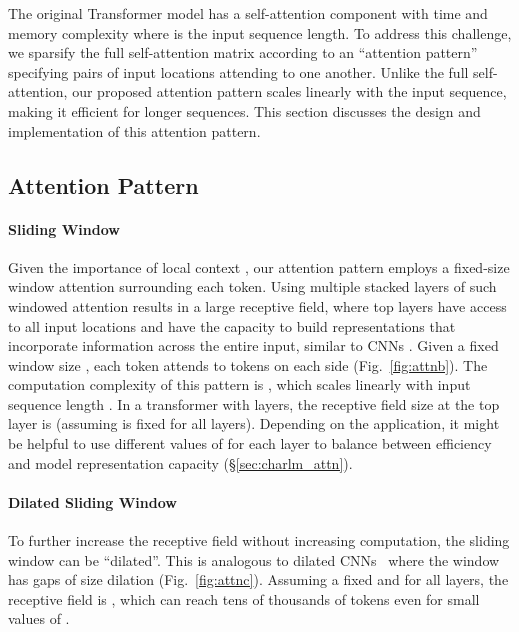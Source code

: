 \documentclass[11pt,a4paper]{article}
\begin{document}
The original Transformer model has a self-attention component with  time and memory complexity where  is the input sequence length. To address this challenge, we sparsify the full self-attention matrix according to 
an ``attention pattern'' specifying pairs of input locations attending to one another.
Unlike the full self-attention, our proposed attention pattern scales linearly with the input sequence, making it efficient for longer sequences.
This section discusses the design and implementation of this attention pattern. 



\subsection{Attention Pattern}
\label{sec:attn}


\paragraph{Sliding Window}
Given the importance of local context \cite{Kovaleva2019RevealingTD}, our attention pattern employs a fixed-size window attention
surrounding each token.
Using multiple stacked layers of such windowed attention results in a large receptive field, where top layers have access to all input locations and have the capacity to build representations that incorporate information across the entire input, similar to CNNs \cite{Wu2019PayLA}.
Given a fixed window size , each token attends to  tokens on each side (Fig.~\ref{fig:attnb}).
The computation complexity of this pattern is , which scales linearly with input sequence length . In a transformer with  layers, the receptive field size at the top layer is  (assuming  is fixed for all layers).
Depending on the application, it might be helpful to use different values of  for each layer to balance between efficiency and model representation capacity (\S\ref{sec:charlm_attn}).

\paragraph{Dilated Sliding Window}
To further increase the receptive field without increasing computation, the sliding window can be ``dilated''. This is analogous to dilated CNNs~\cite{Oord2016WaveNetAG} where the window has gaps of size dilation  (Fig.~\ref{fig:attnc}).
Assuming a fixed  and  for all layers, the receptive field 
is , which can reach tens of thousands
of tokens even for small values of . 
\end{document}
